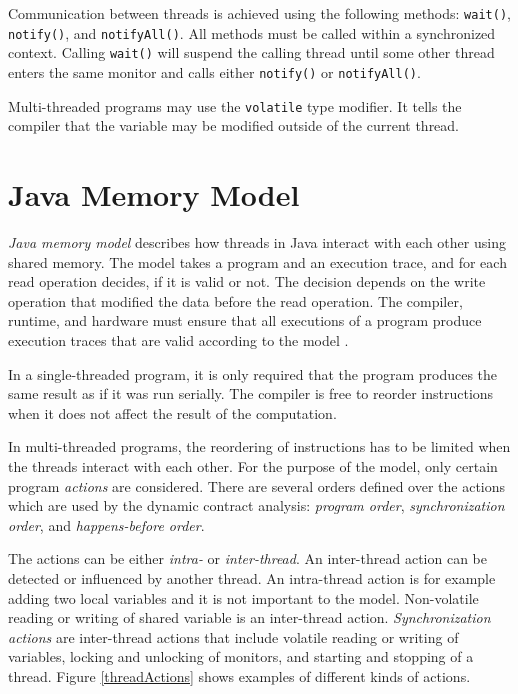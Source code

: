 Communication between threads is achieved using the following methods:
\texttt{wait()}, \texttt{notify()}, and \texttt{notifyAll()}. All methods must
be called within a synchronized context. Calling \texttt{wait()} will suspend
the calling thread until some other thread enters the same monitor and calls
either \texttt{notify()} or \texttt{notifyAll()}.

Multi-threaded programs may use the \texttt{volatile} type modifier. It tells
the compiler that the variable may be modified outside of the current thread.

\section{Java Memory Model}


\emph{Java memory model} describes how threads in Java interact with each other
using shared memory. The model takes a program and an execution trace, and for
each read operation decides, if it is valid or not. The decision depends on the
write operation that modified the data before the read operation. The compiler,
runtime, and hardware must ensure that all executions of a program produce
execution traces that are valid according to the model \cite{jmmspec}.

In a single-threaded program, it is only required that the program produces the
same result as if it was run serially. The compiler is free to reorder
instructions when it does not affect the result of the computation.

In multi-threaded programs, the reordering of instructions has to be limited
when the threads interact with each other. For the purpose of the model, only
certain program \emph{actions} are considered. There are several orders defined
over the actions which are used by the dynamic contract analysis: \emph{program
order}, \emph{synchronization order}, and \emph{happens-before order}.

The actions can be either \emph{intra-} or \emph{inter-thread}. An inter-thread
action can be detected or influenced by another thread. An intra-thread action
is for example adding two local variables and it is not important to the model.
Non-volatile reading or writing of shared variable is an inter-thread action.
\emph{Synchronization actions} are inter-thread actions that include volatile
reading or writing of variables, locking and unlocking of monitors, and starting
and stopping of a thread. Figure \ref{threadActions} shows examples of different
kinds of actions.

